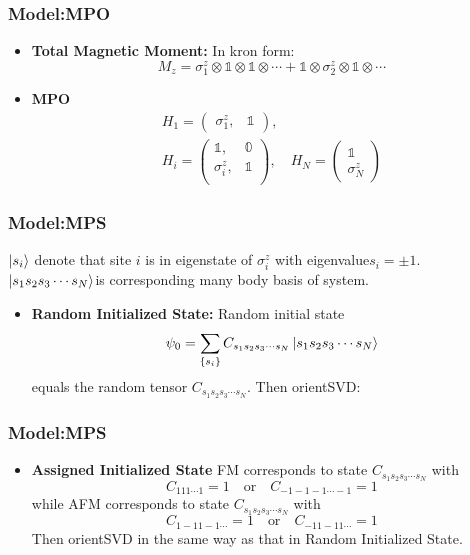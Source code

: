 \documentclass{beamer}
\begin{document}
\begin{frame}
	\frametitle{Model:MPO}
	\begin{itemize}
		\item \textbf{Total Magnetic Moment:} In kron form:
		\begin{equation}
			M_z =\sigma_1^z\otimes\mathbb{1}\otimes\mathbb{1}\otimes\cdots + \mathbb{1}\otimes \sigma_2^z\otimes\mathbb{1}\otimes\cdots
		\end{equation}
		\item \textbf{MPO} 
		\begin{equation}
			\begin{gathered}
				H_1 = \begin{pmatrix}
					\sigma_1^z,&\mathbb{1}
				\end{pmatrix},\\
				H_i = \begin{pmatrix}
					\mathbb{1},&\mathbb{0}\\
					\sigma_i^z,&\mathbb{1}\\
				\end{pmatrix},\quad 
				H_N = \begin{pmatrix}
					\mathbb{1}\\ \sigma_N^z
				\end{pmatrix}
			\end{gathered}
		\end{equation}
	\end{itemize}
\end{frame}

\begin{frame}
	\frametitle{Model:MPS}
	$\ket{s_i}$ denote that site $i$ is in eigenstate of $\sigma_i^z$ with eigenvalue$s_i=\pm 1$.\\
	$\ket{s_1s_2s_3\cdots s_N}$is corresponding many body basis of system.
	\begin{itemize}
		\item \textbf{Random Initialized State:} Random initial state
		\begin{equation}
			\psi_0 = \sum_{\{ s_i \}}C_{s_1s_2s_3\cdots s_N}\ket{s_1s_2s_3\cdots s_N}
		\end{equation}
		equals the random tensor $C_{s_1s_2s_3\cdots s_N}$. Then orientSVD:
	\end{itemize}
\end{frame}

\begin{frame}
	\frametitle{Model:MPS}
	\begin{itemize}
		\item \textbf{Assigned Initialized State} FM corresponds to state $C_{s_1s_2s_3\cdots s_N}$ with 
		\begin{equation}
			C_{111\cdots 1}=1\quad \text{or}\quad  C_{-1-1-1\cdots -1}=1
		\end{equation}
		while AFM corresponds to state $C_{s_1s_2s_3\cdots s_N}$ with 
		\begin{equation}
			C_{1-11-1\cdots}=1\quad \text{or}\quad  C_{-11-11\cdots}=1
		\end{equation}
		Then orientSVD in the same way as that in Random Initialized State.
	\end{itemize}
\end{frame}
\end{document}
